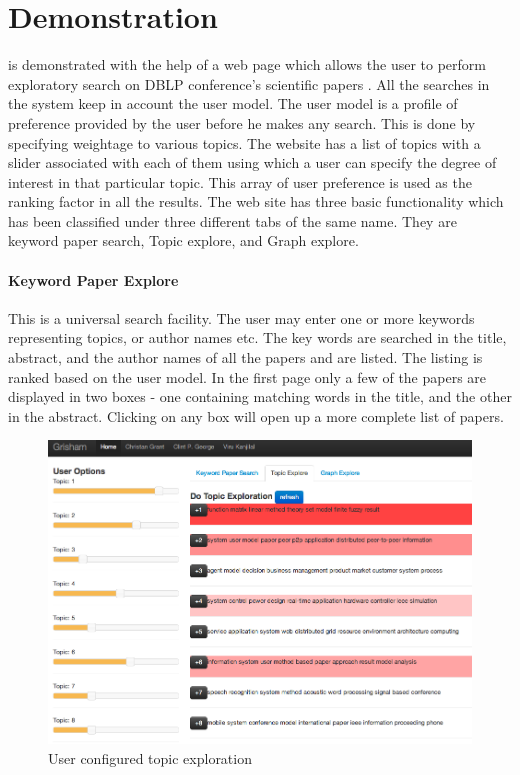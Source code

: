 \section{Demonstration}


\system is demonstrated with the help of a web page which allows the user to perform exploratory search on DBLP conference's scientific papers \cite{Tang:2008:EMA:1367497.1367722}. All the searches in the system keep in account the user model. The user model is a profile of preference provided by the user before he makes any search. This is done by specifying weightage to various topics. The \system website has a list of topics with a slider associated with each of them using which a user can specify the degree of interest in that particular topic. This array of user preference is used as the ranking factor in all the results. The web site has three basic functionality which has been classified under three different tabs of the same name. They are keyword paper search, Topic explore, and Graph explore. 

\paragraph{Keyword Paper Explore} This is a universal search facility. The user may enter one or more keywords representing topics, or author names etc. The key words are searched in the title, abstract, and the author names of all the papers and are listed. The listing is ranked based on the user model. In the first page only a few of the papers are displayed  in two boxes - one containing matching words in the title, and the other in the abstract. Clicking on any box will open up a more complete list of papers.

\begin{figure}[htb]
\includegraphics[scale=.25,trim=0 0 300 0]{images/topic_exploration.png}
\caption{User configured topic exploration}
\label{fig:topic_exploration}
\end{figure}


